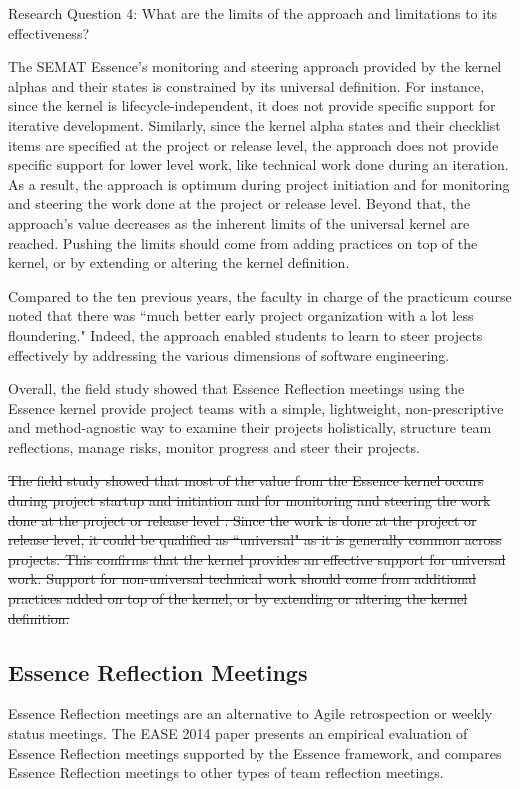 \documentclass[preprint,12pt,3p]{elsarticle}
\begin{document}
Research Question 4: What are the limits of the approach and limitations to its effectiveness?

The SEMAT Essence’s monitoring and steering approach provided by the kernel alphas and their states is constrained by its universal definition. For instance, since the kernel is lifecycle-independent, it does not provide specific support for iterative development. Similarly, since the kernel alpha states and their checklist items are specified at the project or release level, the approach does not provide specific support for lower level work, like technical work done during an iteration. As a result, the approach is optimum during project initiation and for monitoring and steering the work done at the project or release level. Beyond that, the approach’s value decreases as the inherent limits of the universal kernel are reached. Pushing the limits should come from adding practices on top of the kernel, or by extending or altering the kernel definition.

Compared to the ten previous years, the faculty in charge of the practicum course noted that there was ``much better early project organization with a lot less floundering." Indeed, the approach enabled students to learn to steer projects effectively by addressing the various dimensions of software engineering.

Overall, the field study showed that Essence Reflection meetings using the Essence kernel provide project teams with a simple, lightweight, non-prescriptive and method-agnostic way to examine their projects holistically, structure team reflections, manage risks, monitor progress and steer their projects. 

\sout{The field study showed that most of the value from the Essence kernel occurs during project startup and initiation and for monitoring and steering the work done at the project or release level \cite{ICSE2014}. Since the work is done at the project or release level, it could be qualified as ``universal" as it is generally common across projects. This confirms that the kernel provides an effective support for universal work. Support for non-universal technical work should come from additional practices added on top of the kernel, or by extending or altering the kernel definition.}

\subsection{Essence Reflection Meetings}
\label{EssenceReflectionMeetings}
Essence Reflection meetings are an alternative to Agile retrospection or weekly status meetings. The EASE 2014 paper \cite{EASE2014} presents an empirical evaluation of Essence Reflection meetings supported by the Essence framework, and compares Essence Reflection meetings to other types of team reflection meetings.
\end{document}
